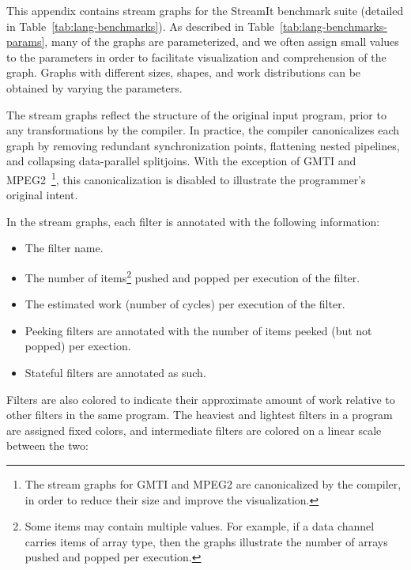 \label{chap:stream-graphs}

This appendix contains stream graphs for the StreamIt benchmark suite
(detailed in Table~\ref{tab:lang-benchmarks}).  As described in
Table~\ref{tab:lang-benchmarks-params}, many of the graphs are
parameterized, and we often assign small values to the parameters in
order to facilitate visualization and comprehension of the graph.
Graphs with different sizes, shapes, and work distributions can be
obtained by varying the parameters.

The stream graphs reflect the structure of the original input program,
prior to any transformations by the compiler.  In practice, the
compiler canonicalizes each graph by removing redundant
synchronization points, flattening nested pipelines, and collapsing
data-parallel splitjoins.  With the exception of GMTI and
MPEG2~\footnote{The stream graphs for GMTI and MPEG2 are canonicalized
  by the compiler, in order to reduce their size and improve the
  visualization.}, this canonicalization is disabled to illustrate the
programmer's original intent.

In the stream graphs, each filter is annotated with the following
information:
\begin{itemize}
\item The filter name.

\item The number of items\footnote{Some items may contain multiple
  values.  For example, if a data channel carries items of array type,
  then the graphs illustrate the number of arrays pushed and popped
  per execution.} pushed and popped per execution of the filter.
\item The estimated work (number of cycles) per execution of the filter.
\item Peeking filters are annotated with the number of items peeked (but not popped) per exection.
\item Stateful filters are annotated as such.
\end{itemize}

Filters are also colored to indicate their approximate amount of work
relative to other filters in the same program.  The heaviest and
lightest filters in a program are assigned fixed colors, and
intermediate filters are colored on a linear scale between the two:

\begin{center}
\end{center}

